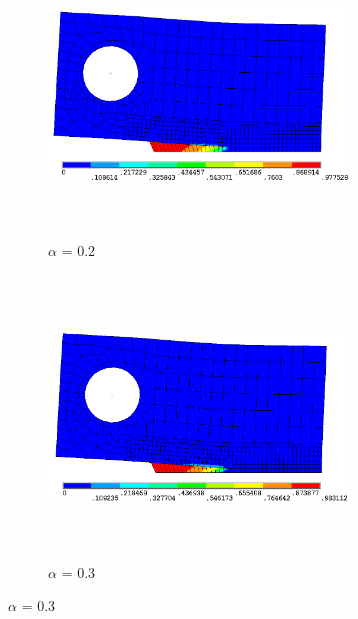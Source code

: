 \documentclass[12pt,a4paper,twoside,openright]{report}
\begin{document}
\FloatBarrier
\begin{figure}[htbp!]\ContinuedFloat
       \captionsetup[subfigure]{justification=centering}
     \begin{subfigure}{0.38\textwidth}
         \includegraphics[width=8cm,height=7.5cm,keepaspectratio]{26.d2_a_0.2.png}
         \caption{$\alpha$ = 0.2}
         \label{fig:d2-a_0.2}
     \end{subfigure}
    \hspace{2cm}
     \captionsetup[subfigure]{justification=centering}
     \begin{subfigure}{0.38\textwidth}
         \includegraphics[width=8cm,height=7.5cm,keepaspectratio]{26.d2_a_0.3.png}
         \caption{$\alpha$ = 0.3}
         \label{fig:d2-a_0.3}
     \end{subfigure}
\end{figure}
\FloatBarrier
\end{document}
